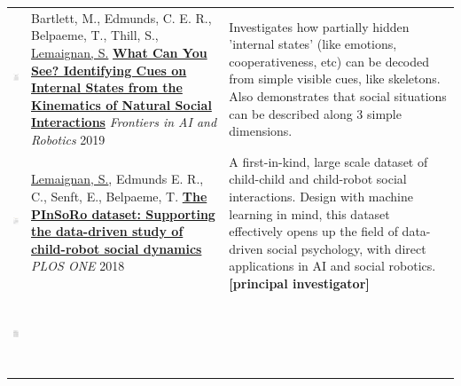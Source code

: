 \documentclass[11pt,a4paper]{report}
\begin{document}
\begin{tabular}{p{1.7cm}p{7cm}p{8cm}}
    \vspace{-.20cm}\includegraphics[height=2.2cm]{thumbs/2019-frontiers-maddy.jpg} &

    Bartlett, M., Edmunds, C. E. R., Belpaeme, T., Thill, S., \ul{Lemaignan, S.} 
    \href{https://doi.org/10.3389/frobt.2019.00049}{\textbf{What Can You See? Identifying Cues on Internal States from the
    Kinematics of Natural Social Interactions}} 
    \newline \textit{Frontiers in AI and Robotics} 2019
    & \small Investigates how partially hidden 'internal states' (like emotions,
    cooperativeness, etc) can be decoded from simple visible cues, like
    skeletons. Also demonstrates that social situations can be described along 3
    simple dimensions.\textbf{}\\


    \vspace{-.20cm}\includegraphics[height=2.2cm]{thumbs/2018-plosone.jpg} &

    \ul{Lemaignan, S.}, Edmunds E. R., C., Senft, E., Belpaeme, T.
    \newline\href{https://doi.org/10.1371/journal.pone.0205999}{\textbf{The
    PInSoRo dataset: Supporting the data-driven study of child-robot social
    dynamics}}
    \newline \textit{PLOS ONE} 2018
    & \small A first-in-kind, large scale dataset of child-child and child-robot social interactions. Design
    with machine learning in mind, this dataset effectively opens up the field
    of data-driven social psychology, with direct applications in AI and social
    robotics.\textbf{[principal investigator]}\\

    \vspace{-.20cm}\includegraphics[height=2.2cm]{thumbs/2018-underworlds.jpg} &


\end{tabular}
\end{document}
